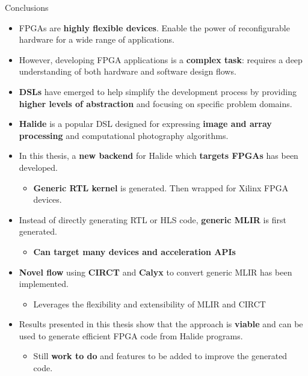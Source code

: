 \documentclass[8pt,a4paper,oneside,hidelinks,aspectratio=169,dvipsnames]{beamer}
\begin{document}
\begin{frame}{Conclusions}
  \begin{itemize}
    \item FPGAs are \textbf{highly flexible devices}. Enable the power of reconfigurable hardware for a wide range of applications.
    \item However, developing FPGA applications is a \textbf{complex task}: requires a deep understanding of both hardware and software design flows.
    \item \textbf{DSLs} have emerged to help simplify the development process by providing \textbf{higher levels of abstraction} and focusing on specific problem domains.
    \item \textbf{Halide} is a popular DSL designed for expressing \textbf{image and array processing} and computational photography algorithms.
    \item In this thesis, a \textbf{new backend} for Halide which \textbf{targets FPGAs} has been developed.
          \begin{itemize}
            \item \textbf{Generic RTL kernel} is generated. Then wrapped for Xilinx FPGA devices.
          \end{itemize}
    \item Instead of directly generating RTL or HLS code, \textbf{generic MLIR} is first generated.
          \begin{itemize}
            \item \textbf{Can target many devices and acceleration APIs}
          \end{itemize}
    \item \textbf{Novel flow} using \textbf{CIRCT} and \textbf{Calyx} to convert generic MLIR has been implemented.
          \begin{itemize}
            \item Leverages the flexibility and extensibility of MLIR and CIRCT
          \end{itemize}
    \item Results presented in this thesis show that the approach is \textbf{viable} and can be used to generate efficient FPGA code from Halide programs.
          \begin{itemize}
            \item Still \textbf{work to do} and features to be added to improve the generated code.
          \end{itemize}
  \end{itemize}
\end{frame}
\end{document}
